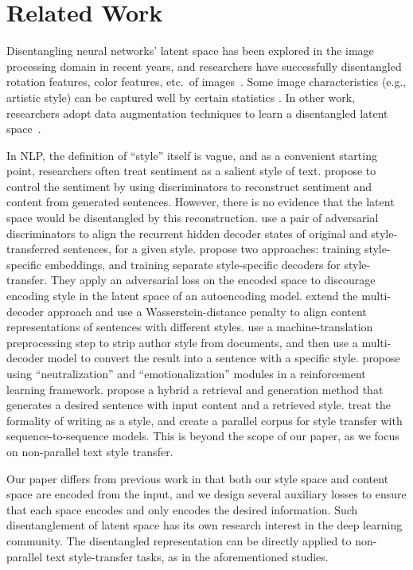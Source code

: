 \documentclass[11pt,a4paper]{article}
\begin{document}
\section{Related Work}

Disentangling neural networks' latent space has been explored in the image processing domain in recent years, and researchers have successfully disentangled rotation features, color features, etc.~of images~\cite{chen2016infogan,luan2017deep}.
Some image characteristics (e.g., artistic style) can be captured well by certain statistics \cite{gatys2016image}.
In other work, researchers adopt data augmentation techniques to learn a disentangled latent space~\cite{kulkarni2015deep,champandard2016semantic}.

In NLP, the definition of ``style'' itself is vague, and as a convenient starting point, researchers often treat sentiment as a salient style of text.
\citet{hu2017toward} propose to control the sentiment by using discriminators to reconstruct sentiment and content from generated sentences.
However, there is no evidence that the latent space would be disentangled by this reconstruction.
\citet{shen2017style} use a pair of adversarial discriminators to align the recurrent hidden decoder states of original and style-transferred sentences, for a given style.
\citet{fu2018style} propose two approaches: training style-specific embeddings, and training separate style-specific decoders for style-transfer. They apply an adversarial loss on the encoded space to discourage encoding style in the latent space of an autoencoding model. \citet{zhao2018adversarially} extend the multi-decoder approach and use a Wasserstein-distance penalty to align content representations of sentences with different styles. 
\citet{prabhumoye2018style} use a machine-translation preprocessing step to strip author style from documents, and then use a multi-decoder model to convert the result into a sentence with a specific style.
\citet{xu2018unpaired} propose using ``neutralization'' and ``emotionalization'' modules in a reinforcement learning framework.
\citet{li2018delete} propose a hybrid a retrieval and generation method that generates a desired sentence with input content and a retrieved style.
\citet{rao2018dear} treat the formality of writing as a style, and create a parallel corpus for style transfer with sequence-to-sequence models. This is beyond the scope of our paper, as we focus on non-parallel text style transfer.

Our paper differs from previous work in that both our style space and content space are encoded from the input, and we design several auxiliary losses to ensure that each space encodes and only encodes the desired information.
Such disentanglement of latent space has its own research interest in the deep learning community.
The disentangled representation can be directly applied to non-parallel text style-transfer tasks, as in the aforementioned studies.
\end{document}
